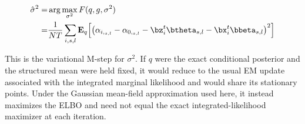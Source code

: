 \begin{align}
    \hat{\sigma}^{2 } = &\arg\max_{\sigma^2} F(q,g,\sigma^2)\\
    =& \frac{1}{NT}\sum_{i,s,l}\mathbf{E}_q\!\left[\left(\alpha_{i,_{s,l}}-\alpha_{0,_{s,l}}-\bz_i^t\btheta_{s,l}-\bx_i^t\bbeta_{s,l}\right)^2\right]
\end{align}

This is the variational M-step for $\sigma^2$. If $q$ were the exact conditional posterior and the structured mean were held fixed, it would reduce to the usual EM update associated with the integrated marginal likelihood and would share its stationary points. Under the Gaussian mean-field approximation used here, it instead maximizes the ELBO and need not equal the exact integrated-likelihood maximizer at each iteration.



 
